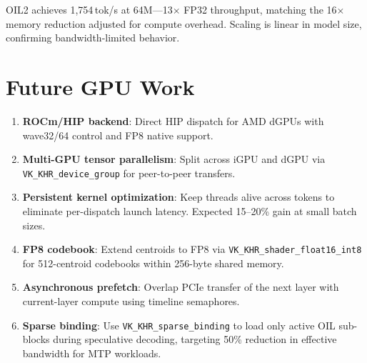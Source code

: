 OIL2 achieves 1,754\,tok/s at 64M---13$\times$ FP32 throughput, matching the
16$\times$ memory reduction adjusted for compute overhead. Scaling is linear
in model size, confirming bandwidth-limited behavior.

\section{Future GPU Work}
\label{sec:gpu_future}

\begin{enumerate}
    \item \textbf{ROCm/HIP backend}: Direct HIP dispatch for AMD dGPUs with
          wave32/64 control and FP8 native support.
    \item \textbf{Multi-GPU tensor parallelism}: Split across iGPU and dGPU
          via \texttt{VK\_KHR\_device\_group} for peer-to-peer transfers.
    \item \textbf{Persistent kernel optimization}: Keep threads alive across
          tokens to eliminate per-dispatch launch latency. Expected 15--20\%
          gain at small batch sizes.
    \item \textbf{FP8 codebook}: Extend centroids to FP8 via
          \texttt{VK\_KHR\_shader\_float16\_int8} for 512-centroid codebooks
          within 256-byte shared memory.
    \item \textbf{Asynchronous prefetch}: Overlap PCIe transfer of the next
          layer with current-layer compute using timeline semaphores.
    \item \textbf{Sparse binding}: Use \texttt{VK\_KHR\_sparse\_binding} to
          load only active OIL sub-blocks during speculative decoding, targeting
          50\% reduction in effective bandwidth for MTP workloads.
\end{enumerate}